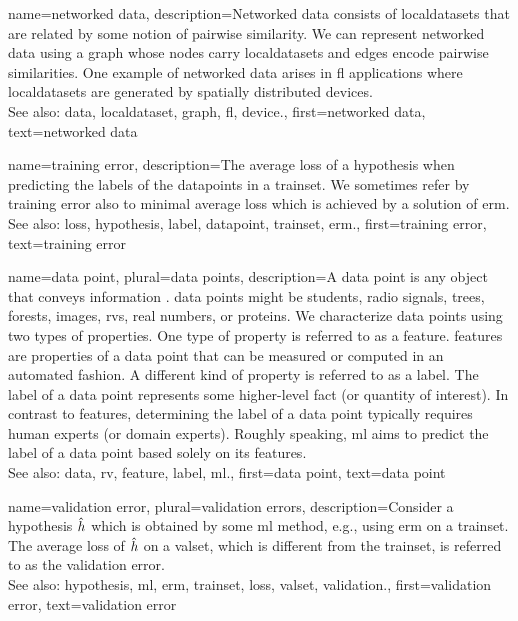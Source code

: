 {name={networked data},
	description={Networked \gls{data} consists of \glspl{localdataset} 
		that are related by some notion of pairwise similarity. We can represent networked 
		\gls{data} using a \gls{graph} whose nodes carry \glspl{localdataset} and edges encode 
		pairwise similarities. One example of networked \gls{data} arises in \gls{fl} applications 
		where \glspl{localdataset} are generated by spatially distributed \glspl{device}.
			\\
		See also: \gls{data}, \gls{localdataset}, \gls{graph}, \gls{fl}, \gls{device}.}, 
	first={networked data},
	text={networked data}  
}

{name={training error},
	description={The average \gls{loss} of a \gls{hypothesis} when 
		predicting the \glspl{label} of the \glspl{datapoint} in a \gls{trainset}. 
		We sometimes refer by training error also to minimal average \gls{loss} 
		which is achieved by a solution of \gls{erm}.
				\\
		See also: \gls{loss}, \gls{hypothesis}, \gls{label}, \gls{datapoint}, \gls{trainset}, \gls{erm}.},
	first={training error},
	text={training error}  
}

{name={data point}, plural={data points},
	description={A \gls{data} point is any object that conveys information \cite{coverthomas}. \Gls{data} points might be 
		students, radio signals, trees, forests, images, \glspl{rv}, real numbers, or proteins. We characterize \gls{data} points 
		using two types of properties. One type of property is referred to as a \gls{feature}. \Glspl{feature} are properties of a 
		\gls{data} point that can be measured or computed in an automated fashion. 
		A different kind of property is referred to as a \gls{label}. The \gls{label} of 
		a \gls{data} point represents some higher-level fact (or quantity of interest). In 
		contrast to \glspl{feature}, determining the \gls{label} of a \gls{data} point typically 
		requires human experts (or domain experts). Roughly speaking, \gls{ml} aims to predict 
		the \gls{label} of a \gls{data} point based solely on its \glspl{feature}. 
				\\
		See also: \gls{data}, \gls{rv}, \gls{feature}, \gls{label}, \gls{ml}.}, 
	first={data point},
	text={data point}  
}


{name={validation error}, plural={validation errors},
 	description={Consider a \gls{hypothesis} $\hat{h}$ which is 
 		obtained by some \gls{ml} method, e.g., using \gls{erm} on a \gls{trainset}. The average \gls{loss} 
 		of $\hat{h}$ on a \gls{valset}, which is different from the \gls{trainset}, is referred 
 		to as the \gls{validation} error.
			\\
		See also: \gls{hypothesis}, \gls{ml}, \gls{erm}, \gls{trainset}, \gls{loss}, \gls{valset}, \gls{validation}.},
	first={validation error},
	text={validation error}  
}

